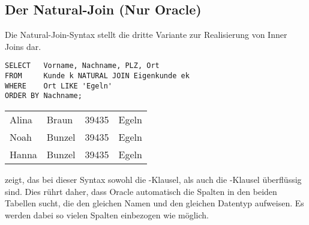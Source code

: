         \subsection{Der Natural-Join (Nur Oracle)}
          Die Natural-Join-Syntax stellt die dritte Variante zur Realisierung von Inner Joins dar.
          \begin{lstlisting}[language=oracle_sql,caption={Die Natural-Join-Syntax},label=sql04_08]
SELECT   Vorname, Nachname, PLZ, Ort
FROM     Kunde k NATURAL JOIN Eigenkunde ek
WHERE    Ort LIKE 'Egeln'
ORDER BY Nachname;
          \end{lstlisting}
          \begin{center}
            \begin{small}
              \tablehead{}
              \begin{oraclesql}
                \begin{supertabular}{llll}
                  Alina & Braun & 39435 & Egeln \\
                  Noah & Bunzel & 39435 & Egeln \\
                  Hanna & Bunzel & 39435 & Egeln \\
                \end{supertabular}
              \end{oraclesql}
            \end{small}
          \end{center}
           zeigt, das bei dieser Syntax sowohl die -Klausel, als auch die -Klausel überflüssig sind. Dies rührt daher, dass Oracle automatisch die Spalten in den beiden Tabellen sucht, die den gleichen Namen und den gleichen Datentyp aufweisen. Es werden dabei so vielen Spalten einbezogen wie möglich.

